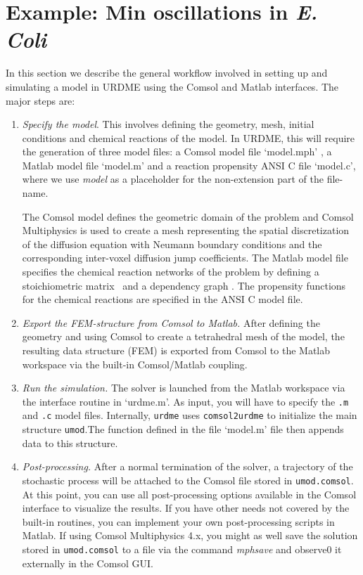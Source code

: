 \section{Example: Min oscillations in \emph{E. Coli}}
\label{sec:ex}

In this section we describe the general workflow involved in setting up and
simulating a model in URDME using the Comsol and Matlab
interfaces. The major steps are:

\begin{enumerate}
\item \emph{Specify the model}. This involves defining the geometry,
  mesh, initial conditions and chemical reactions of the model. In
  URDME, this will require the generation of three model
  files: a Comsol model file `model.mph' , a Matlab model file
  `model.m' and a reaction propensity ANSI C file `model.c', where we use
  {\it model} as a placeholder for the non-extension part of the
  file-name.
  
  The Comsol model defines the geometric domain of the problem and
  Comsol Multiphysics is used to create a mesh representing the
  spatial discretization of the diffusion equation with Neumann
  boundary conditions and the corresponding inter-voxel diffusion jump
  coefficients. The Matlab model file specifies the chemical reaction
  networks of the problem by defining a stoichiometric matrix
  \varN\ and a dependency graph \varG. The propensity functions for
  the chemical reactions are specified in the ANSI C model file.
	
\item \emph{Export the FEM-structure from Comsol to Matlab.} After
  defining the geometry and using Comsol to create a tetrahedral mesh
  of the model, the resulting data structure (FEM) is exported from
  Comsol to the Matlab workspace via the built-in Comsol/Matlab
  coupling.
	
\item \emph{Run the simulation.} The solver is launched from the
  Matlab workspace via the interface routine in `urdme.m'. As input,
  you will have to specify the \texttt{.m} and \texttt{.c} model
  files. Internally, \texttt{urdme} uses \texttt{comsol2urdme} to
  initialize the main structure \texttt{umod}.The function defined in the 
  file `model.m' file then appends data to this structure.
  	
\item \emph{Post-processing.} After a normal termination of the
  solver, a trajectory of the stochastic process will be attached to
  the Comsol file stored in \texttt{umod.comsol}. At this point, you can use all post-processing
  options available in the Comsol interface to visualize the results. If you have
  other needs not covered by the built-in routines, you can implement
  your own post-processing scripts in Matlab. If using Comsol Multiphysics 4.x, you
  might as well save the solution stored in \texttt{umod.comsol} to a file via the command \textit{mphsave}
  and observe0 it externally in the Comsol GUI.
\end{enumerate}
 
